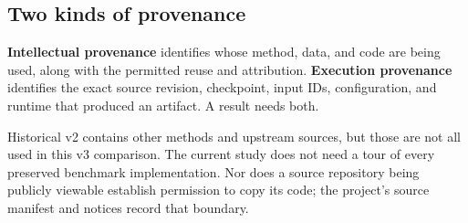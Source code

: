 \subsection{Two kinds of provenance}
\textbf{Intellectual provenance} identifies whose method, data, and code are
being used, along with the permitted reuse and attribution. \textbf{Execution
provenance} identifies the exact source revision, checkpoint, input IDs,
configuration, and runtime that produced an artifact. A result needs both.

Historical v2 contains other methods and upstream sources, but those are not all
used in this v3 comparison. The current study does not need a tour of every
preserved benchmark implementation. Nor does a source repository being publicly
viewable establish permission to copy its code; the project's source manifest
and notices record that boundary.

